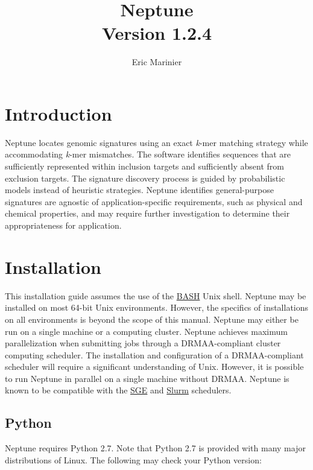 \documentclass[a4paper,10pt]{article}
\title{Neptune\\ \normalsize Version 1.2.4}
\author{Eric Marinier}
\begin{document}
\maketitle

\newpage
\tableofcontents

\newpage
\section{Introduction}

Neptune locates genomic signatures using an exact \textit{k}-mer matching strategy while accommodating \textit{k}-mer mismatches. The software identifies sequences that are sufficiently represented within inclusion targets and sufficiently absent from exclusion targets. The signature discovery process is guided by probabilistic models instead of heuristic strategies. Neptune identifies general-purpose signatures are agnostic of application-specific requirements, such as physical and chemical properties, and may require further investigation to determine their appropriateness for application.

\newpage
\section{Installation}

This installation guide assumes the use of the \href{https://en.wikipedia.org/wiki/Bash_(Unix_shell)}{BASH} Unix shell. Neptune may be installed on most 64-bit Unix environments. However, the specifics of installations on all environments is beyond the scope of this manual. Neptune may either be run on a single machine or a computing cluster. Neptune achieves maximum parallelization when submitting jobs through a DRMAA-compliant cluster computing scheduler. The installation and configuration of a DRMAA-compliant scheduler will require a significant understanding of Unix. However, it is possible to run Neptune in parallel on a single machine without DRMAA. Neptune is known to be compatible with the \href{http://gridscheduler.sourceforge.net/}{SGE} and \href{http://slurm.schedmd.com/}{Slurm} schedulers.

\subsection{Python}

Neptune requires Python 2.7. Note that Python 2.7 is provided with many major distributions of Linux. The following may check your Python version:
\end{document}
